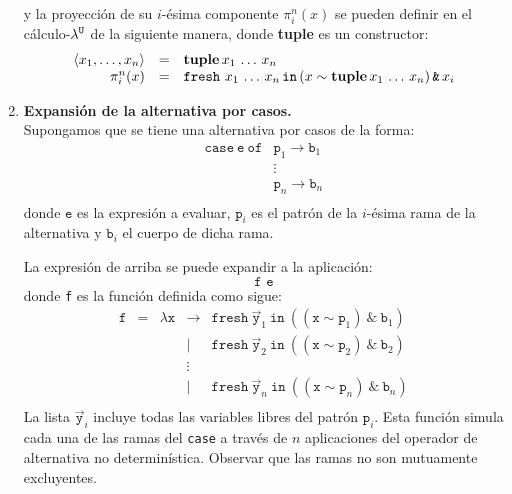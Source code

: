 \begin{enumerate}
    y la proyección de su $i$-ésima componente $\pi^n_i(x)$ se pueden definir
    en el cálculo-$\lambda^{\mathtt{U}}$ de la siguiente manera, donde {\bf tuple} es un constructor:
    \[
       \begin{array}{rcl}
         \langle x_1, \hdots, x_n \rangle & = & {\bf tuple}\,x_1\,\hdots\,x_n
       \\
         \pi^n_i(x) & = & \texttt{fresh}\ x_1\,\hdots\,x_n \,\texttt{in}\, (x \sim {\bf tuple}\,x_1\,\hdots\,x_n) \,\texttt{\&}\, x_i \\
       \end{array}
    \]
  \item {\bf Expansión de la alternativa por casos.} \\
    Supongamos
    que se tiene una alternativa por casos de la forma:  
    $$
    \begin{array}{cl}
      \texttt{case}\ \texttt{e}\ \texttt{of}
      & \texttt{p}_1 \rightarrow \texttt{b$_1$}\\
      & \vdots\\
      & \texttt{p}_n \rightarrow \texttt{b$_n$}\\
    \end{array}
    $$
    donde $\texttt{e}$ es la expresión a evaluar,
    $\texttt{p}_i$ es el patrón de la $i$-ésima rama de la alternativa
    y $\texttt{b}_i$ el cuerpo de dicha rama.
    
    La expresión de arriba se puede expandir a la aplicación:
    \[
      \texttt{f e}
    \]
    donde \texttt{f} es la función definida como sigue:
    $$
    \begin{array}{llcrl}
      \texttt{f}
      & = & \lambda \texttt{x}
            & \rightarrow & \texttt{fresh}\ \vec{\texttt{y}}_1\ \texttt{in}\ ((\texttt{x} \sim \texttt{p}_1)\ \texttt{\&}\ \texttt{b}_1) \\
      &   & & \vert       & \texttt{fresh}\ \vec{\texttt{y}}_2\ \texttt{in}\ ((\texttt{x} \sim \texttt{p}_2)\ \texttt{\&}\ \texttt{b}_2) \\
      &   & & \vdots \\
      &   & & \vert       & \texttt{fresh}\ \vec{\texttt{y}}_n\ \texttt{in}\ ((\texttt{x} \sim \texttt{p}_n)\ \texttt{\&}\ \texttt{b}_n) \\
    \end{array}
    $$
    La lista $\vec{\texttt{y}}_i$ incluye todas las variables libres del patrón $\texttt{p}_i$.
    Esta función simula cada una de las ramas del \texttt{case}
    a través de $n$ aplicaciones del operador de alternativa no determinística.
    Observar que las ramas no son mutuamente excluyentes.
\end{enumerate}

